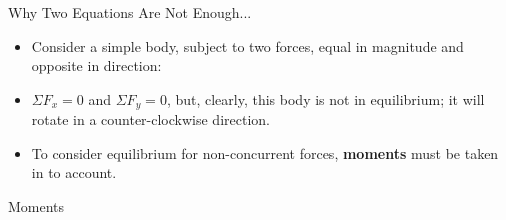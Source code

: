 \documentclass[9pt, xcolor={svgnames, x11names},professionalfonts]{beamer}
\def\scale{1}
\begin{document}
\begin{frame}{Why Two Equations Are Not Enough...}
	\begin{itemize}
		\item Consider a simple body, subject to two forces, equal in magnitude and opposite in direction:
	\end{itemize}

	\def\scale{0.65}
	\begin{center}
		\tcbox[colback=white,boxsep=0pt,top=15pt,bottom=15pt,left=5pt,right=5pt, enhanced, drop fuzzy shadow,colframe=structure]{
			
		}
	\end{center}

	\begin{itemize}
		\item<2-> $\Sigma F_x=0$ and $\Sigma F_y=0$, but, clearly, this body is not in equilibrium; it will rotate in a counter-clockwise direction.
		\item<3-> To consider equilibrium for non-concurrent forces, {\bfseries moments} must be taken in to account.
	\end{itemize}
\end{frame}


\begin{frame}{Moments}
	\def\scale{0.75}
	\begin{center}
		\tcb[left=5mm, right=5mm]{
			\centering
			
		}

	\end{center}

\end{frame}

\end{document}
